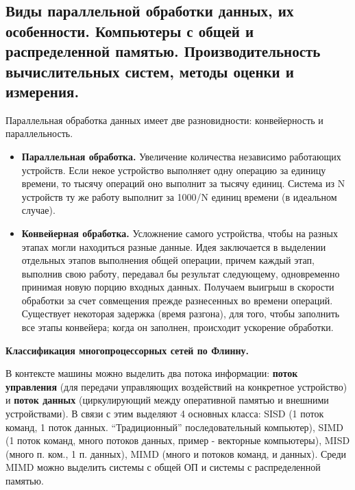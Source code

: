 \subsection{Виды параллельной обработки данных, их особенности. Компьютеры с общей и распределенной памятью. Производительность вычислительных систем, методы оценки и измерения.}


Параллельная обработка данных имеет две разновидности: конвейерность и параллельность.
\begin{itemize}
    \item \textbf{Параллельная обработка.} Увеличение количества независимо работающих устройств. Если некое устройство выполняет одну операцию за единицу времени, то тысячу операций оно выполнит за тысячу единиц. Система из N устройств ту же работу выполнит за 1000/N единиц времени (в идеальном случае).
    \item \textbf{Конвейерная обработка.} Усложнение самого устройства, чтобы на разных этапах могли находиться разные данные. Идея заключается в выделении отдельных этапов выполнения общей операции, причем каждый этап, выполнив свою работу, передавал бы результат следующему, одновременно принимая новую порцию входных данных. Получаем выигрыш в скорости обработки за счет совмещения прежде разнесенных во времени операций. Существует некоторая задержка (время разгона), для того, чтобы заполнить все этапы конвейера; когда он заполнен, происходит ускорение обработки.
\end{itemize}

\textbf{Классификация многопроцессорных сетей по Флинну.}

В контексте машины можно выделить два потока информации: \textbf{поток управления} (для передачи управляющих воздействий на конкретное устройство) и \textbf{поток данных} (циркулирующий между оперативной памятью и внешними устройствами). В связи с этим выделяют 4 основных класса: SISD (1 поток команд, 1 поток данных. ``Традиционный'' последовательный компьютер), SIMD (1 поток команд, много потоков данных, пример - векторные компьютеры), MISD (много п. ком., 1 п. данных), MIMD (много и потоков команд, и данных). Среди MIMD можно выделить системы с общей ОП и системы с распределенной памятью.

